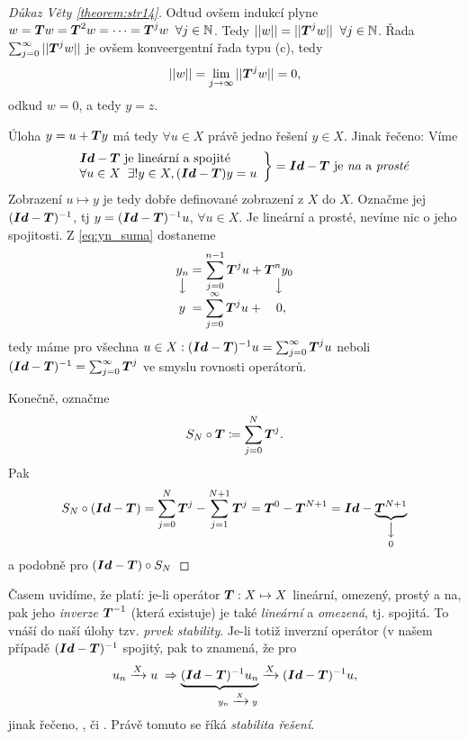 \begin{proof}[Důkaz Věty \ref{theorem:str14}]
Odtud ovšem indukcí plyne $w= \boldsymbol{T} w= \boldsymbol{T} ^2w=\dots = \boldsymbol{T} ^jw \;\; \forall j\in \mathbb{N}$.  Tedy $||w||=|| \boldsymbol{T} ^jw||\;\; \forall j\in \mathbb{N}$. Řada $\sum_{j=0}^\infty|| \boldsymbol{T} ^j w||$ je ovšem konveergentní řada typu (c), tedy 
$$||w||=\lim\limits_{j\rightarrow\infty}|| \boldsymbol{T} ^jw||=0,$$
odkud $w=0$, a tedy $y=z$.

Úloha $y=u+ \boldsymbol{T} y$ má tedy $\forall u\in X$ právě jedno řešení $y\in X$. Jinak řečeno: Víme \begin{equation*}
    \begin{split}
        \left.
    \begin{array}{ll}
        &\boldsymbol{Id}- \boldsymbol{T}  \text{ je lineární a spojité} \\
        &\forall u\in X\;\;\exists ! y\in X, (\boldsymbol{Id}-\boldsymbol{T})y=u
    \end{array}
        \right \}=\boldsymbol{Id}- \boldsymbol{T}  \text{ je \emph{na} a \emph{prosté}}
    \end{split}
\end{equation*}
Zobrazení $u\mapsto y$ je tedy dobře definované zobrazení z $X$ do $X$. Označme jej $(\boldsymbol{Id} - \boldsymbol{T} )^{-1}$, tj $y=(\boldsymbol{Id}- \boldsymbol{T} )^{-1} u$, $\forall u\in X$. Je lineární a prosté, nevíme nic o jeho spojitosti.
Z \ref{eq:yn_suma} dostaneme 
\begin{equation*}
    \begin{split}
        \underset{\big\downarrow}{y_n} &= \sum\limits_{j=0}^{n-1} \boldsymbol{T} ^ju+\underset{\big\downarrow}{ \boldsymbol{T} ^ny_0}\\[-7pt]
        y\;&=\sum\limits_{j=0}^\infty  \boldsymbol{T} ^ju+\quad0,
    \end{split}
\end{equation*}
tedy máme pro všechna $u\in X: (\boldsymbol{Id}- \boldsymbol{T} )^{-1}u=\sum_{j=0}^\infty  \boldsymbol{T} ^ju$ neboli $(\boldsymbol{Id}- \boldsymbol{T} )^{-1}=\sum_{j=0}^\infty  \boldsymbol{T} ^j$ ve smyslu rovnosti operátorů.

Konečně, označme
$$S_N \circ \boldsymbol{T} \coloneqq \sum\limits_{j=0}^N  \boldsymbol{T} ^j.$$
Pak 
$$S_N\circ(\boldsymbol{Id}- \boldsymbol{T} )=\sum\limits_{j=0}^N  \boldsymbol{T} ^j-\sum\limits_{j=1}^{N+1}  \boldsymbol{T} ^j =  \boldsymbol{T} ^0- \boldsymbol{T} ^{N+1}=\boldsymbol{Id}-\underset{0}{\underbrace{ \boldsymbol{T} ^{N+1}}_{\big\downarrow}}$$
a podobně pro $(\boldsymbol{Id}- \boldsymbol{T} )\circ S_N$
\end{proof}

\begin{remark}
Časem uvidíme, že platí: je-li operátor $ \boldsymbol{T} :X\mapsto X$ lineární, omezený, prostý a na, pak jeho \emph{inverze} $ \boldsymbol{T} ^{-1}$ (která existuje) je také \emph{lineární} a \emph{omezená}, tj. spojitá. To vnáší do naší úlohy tzv. \emph{prvek stability}. Je-li totiž inverzní operátor (v našem případě $(\boldsymbol{Id}- \boldsymbol{T} )^{-1}$ spojitý, pak to znamená, že pro 
$$u_n\xrightarrow{X}u\;\Rightarrow\; \underset{\quad\; y_n\;\xrightarrow{X}\;y}{\underbrace{(\boldsymbol{Id}- \boldsymbol{T} )^{-1}u_n}\xrightarrow{X}}(\boldsymbol{Id}- \boldsymbol{T} )^{-1}u,$$
jinak řečeno, , či . Právě tomuto se říká \emph{stabilita řešení}.
\end{remark}

